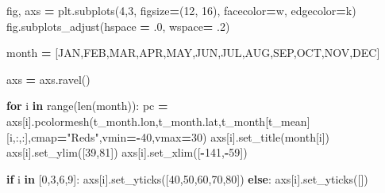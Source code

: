 \documentclass[
]{book}
\newenvironment{Shaded}{\begin{snugshade}}{\end{snugshade}}
\newcommand{\BuiltInTok}[1]{#1}
\newcommand{\ControlFlowTok}[1]{\textcolor[rgb]{0.13,0.29,0.53}{\textbf{#1}}}
\newcommand{\DecValTok}[1]{\textcolor[rgb]{0.00,0.00,0.81}{#1}}
\newcommand{\FloatTok}[1]{\textcolor[rgb]{0.00,0.00,0.81}{#1}}
\newcommand{\KeywordTok}[1]{\textcolor[rgb]{0.13,0.29,0.53}{\textbf{#1}}}
\newcommand{\NormalTok}[1]{#1}
\newcommand{\OperatorTok}[1]{\textcolor[rgb]{0.81,0.36,0.00}{\textbf{#1}}}
\newcommand{\StringTok}[1]{\textcolor[rgb]{0.31,0.60,0.02}{#1}}
\begin{document}
\begin{Shaded}
\begin{Highlighting}[]
\NormalTok{fig, axs }\OperatorTok{=}\NormalTok{ plt.subplots(}\DecValTok{4}\NormalTok{,}\DecValTok{3}\NormalTok{, figsize}\OperatorTok{=}\NormalTok{(}\DecValTok{12}\NormalTok{, }\DecValTok{16}\NormalTok{), facecolor}\OperatorTok{=}\StringTok{\textquotesingle{}w\textquotesingle{}}\NormalTok{, edgecolor}\OperatorTok{=}\StringTok{\textquotesingle{}k\textquotesingle{}}\NormalTok{)}
\NormalTok{fig.subplots\_adjust(hspace }\OperatorTok{=} \FloatTok{.0}\NormalTok{, wspace}\OperatorTok{=} \FloatTok{.2}\NormalTok{)}

\NormalTok{month }\OperatorTok{=}\NormalTok{ [}\StringTok{\textquotesingle{}JAN\textquotesingle{}}\NormalTok{,}\StringTok{\textquotesingle{}FEB\textquotesingle{}}\NormalTok{,}\StringTok{\textquotesingle{}MAR\textquotesingle{}}\NormalTok{,}\StringTok{\textquotesingle{}APR\textquotesingle{}}\NormalTok{,}\StringTok{\textquotesingle{}MAY\textquotesingle{}}\NormalTok{,}\StringTok{\textquotesingle{}JUN\textquotesingle{}}\NormalTok{,}\StringTok{\textquotesingle{}JUL\textquotesingle{}}\NormalTok{,}\StringTok{\textquotesingle{}AUG\textquotesingle{}}\NormalTok{,}\StringTok{\textquotesingle{}SEP\textquotesingle{}}\NormalTok{,}\StringTok{\textquotesingle{}OCT\textquotesingle{}}\NormalTok{,}\StringTok{\textquotesingle{}NOV\textquotesingle{}}\NormalTok{,}\StringTok{\textquotesingle{}DEC\textquotesingle{}}\NormalTok{]}

\NormalTok{axs }\OperatorTok{=}\NormalTok{ axs.ravel()}

\ControlFlowTok{for}\NormalTok{ i }\KeywordTok{in} \BuiltInTok{range}\NormalTok{(}\BuiltInTok{len}\NormalTok{(month)):}
\NormalTok{    pc }\OperatorTok{=}\NormalTok{ axs[i].pcolormesh(t\_month.lon,t\_month.lat,t\_month[}\StringTok{\textquotesingle{}t\_mean\textquotesingle{}}\NormalTok{][i,:,:],cmap}\OperatorTok{=}\StringTok{"Reds"}\NormalTok{,vmin}\OperatorTok{={-}}\DecValTok{40}\NormalTok{,vmax}\OperatorTok{=}\DecValTok{30}\NormalTok{)}
\NormalTok{    axs[i].set\_title(month[i])}
\NormalTok{    axs[i].set\_ylim([}\DecValTok{39}\NormalTok{,}\DecValTok{81}\NormalTok{])}
\NormalTok{    axs[i].set\_xlim([}\OperatorTok{{-}}\DecValTok{141}\NormalTok{,}\OperatorTok{{-}}\DecValTok{59}\NormalTok{])}

    \ControlFlowTok{if}\NormalTok{ i }\KeywordTok{in}\NormalTok{ [}\DecValTok{0}\NormalTok{,}\DecValTok{3}\NormalTok{,}\DecValTok{6}\NormalTok{,}\DecValTok{9}\NormalTok{]:}
\NormalTok{        axs[i].set\_yticks([}\DecValTok{40}\NormalTok{,}\DecValTok{50}\NormalTok{,}\DecValTok{60}\NormalTok{,}\DecValTok{70}\NormalTok{,}\DecValTok{80}\NormalTok{])}
    \ControlFlowTok{else}\NormalTok{:}
\NormalTok{        axs[i].set\_yticks([])}


\end{Highlighting}
\end{Shaded}
\end{document}
